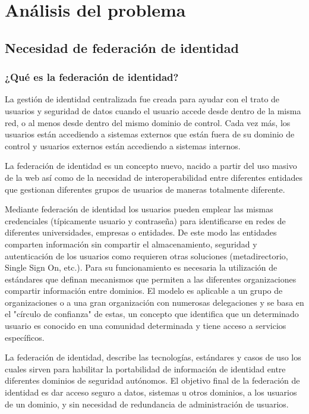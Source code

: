 \chapter{Análisis del problema}
    \section{Necesidad de federación de identidad}
        \subsection{¿Qué es la federación de identidad?}


    La gestión de identidad centralizada fue creada para ayudar con el
    trato de usuarios y seguridad de datos cuando el usuario accede
    desde dentro de la misma red, o al menos desde dentro del mismo
    dominio de control. Cada vez más, los usuarios están accediendo a
    sistemas externos que están fuera de su dominio de control y
    usuarios externos están accediendo a sistemas internos.

    La federación de identidad es un concepto nuevo, nacido a partir
    del uso masivo de la web así como de la necesidad de
    interoperabilidad entre diferentes entidades que gestionan
    diferentes grupos de usuarios de maneras totalmente diferente.

    Mediante federación de identidad los usuarios pueden emplear las mismas
    credenciales (típicamente usuario y contraseña) para identificarse en
    redes de diferentes universidades, empresas o entidades. De este modo
    las entidades comparten información sin compartir el almacenamiento,
    seguridad y autenticación de los usuarios como requieren otras
    soluciones (metadirectorio, Single Sign On, etc.). Para su
    funcionamiento es necesaria la utilización de estándares que definan
    mecanismos que permiten a las diferentes organizaciones compartir
    información entre dominios. El modelo es aplicable a un grupo de
    organizaciones o a una gran organización con numerosas delegaciones y
    se basa en el "círculo de confianza" de estas, un concepto que
    identifica que un determinado usuario es conocido en una comunidad
    determinada y tiene acceso a servicios específicos.

    La federación de identidad, describe las tecnologías, estándares y
    casos de uso los cuales sirven para habilitar la portabilidad de
    información de identidad entre diferentes dominios de seguridad
    autónomos. El objetivo final de la federación de identidad es dar
    acceso seguro a datos, sistemas u otros dominios, a los usuarios
    de un dominio, y sin necesidad de redundancia de administración de
    usuarios.

